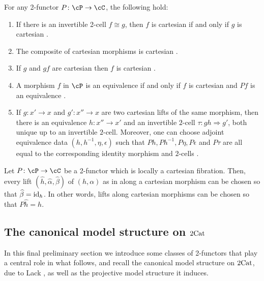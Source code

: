 \documentclass[11pt, dvipsnames]{amsart}
\begin{document}
		\begin{prop} \label{prop:propertiescartesian}
			For any 2-functor $P\colon\cP\to\cC$, the following hold:
            \begin{enumerate}[label=\stlabel{prop:propertiescartesian},ref=\arabic*]
            \item \label{prop:propertiescartesian.0} If there is an invertible 2-cell $f\cong g$, then $f$ is cartesian if and only if $g$ is cartesian {\normalfont \cite[Proposition 3.1.8]{Buckley2014}}.
				\item \label{prop:propertiescartesian.1}
				The composite of cartesian morphisms is cartesian {\normalfont \cite[Proposition 3.1.9]{Buckley2014}}.
                \item \label{prop:propertiescartesian.1.5} If $g$ and $gf$ are cartesian then
$f$ is cartesian {\normalfont \cite[Proposition 3.1.10]{Buckley2014}}.
				\item \label{prop:propertiescartesian.2}
				A morphism $f$ in $\cP$ is an equivalence if and only if $f$ is cartesian and $Pf$ is an equivalence {\normalfont \cite[Propositions 3.1.11 \& 3.1.12]{Buckley2014}}.
				\item \label{prop:propertiescartesian.3}
				If $g\colon x'\to x$ and $g'\colon x''\to x$ are two cartesian lifts of the same morphism,  then there is an equivalence $h\colon x''\to x'$ and an invertible $2$-cell $\tau\colon gh\Rightarrow g'$, both unique up to an invertible $2$-cell. Moreover, one can choose adjoint  equivalence data $(h,h^{-1},\eta,\epsilon)$ such that $Ph,Ph^{-1},P\eta,P\epsilon$ and $P\tau$ are all equal to the corresponding identity morphism and $2$-cells
				{\normalfont\cite[Proposition 3.1.15]{Buckley2014}}.
			\end{enumerate}
		\end{prop}

		\begin{prop}\label{prop:buckley3.2.1}
			Let $P\colon \cP\to\cC$ be a 2-functor which is locally a cartesian fibration. Then, every lift $(\widehat{h},\widehat{\alpha},\widehat{\beta})$ of $(h,\alpha)$ as in {} along a cartesian morphism can be chosen so that $\widehat{\beta} = \mathrm{id}_h$. In other words, lifts along cartesian morphisms can be chosen so that $P\widehat{h}= h$.
		\end{prop}

	\subsection{The canonical model structure on \texorpdfstring{$2\mathrm{Cat}$}{twocat}} In this final preliminary section we introduce some classes of 2-functors that play a central role in what follows, and recall the canonical model structure on $2\mathrm{Cat}$, due to Lack \cite{Lack2002,Lack2004}, as well as the projective model structure it induces.
\end{document}
